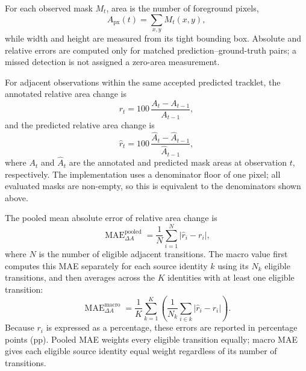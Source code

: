 \documentclass[11pt,a4paper]{article}
\begin{document}
For each observed mask $M_t$, area is the number of foreground pixels,
\begin{equation}
A_{\mathrm{px}}(t)=\sum_{x,y}M_t(x,y),
\end{equation}
while width and height are measured from its tight bounding box. Absolute and relative errors are computed only for matched prediction--ground-truth pairs; a missed detection is not assigned a zero-area measurement.

For adjacent observations within the same accepted predicted tracklet, the annotated relative area change is
\begin{equation}
r_t = 100\,\frac{A_t-A_{t-1}}{A_{t-1}},
\label{eq:relative-area-change}
\end{equation}
and the predicted relative area change is
\begin{equation}
\hat{r}_t = 100\,\frac{\hat{A}_t-\hat{A}_{t-1}}{\hat{A}_{t-1}},
\label{eq:predicted-relative-area-change}
\end{equation}
where $A_t$ and $\hat{A}_t$ are the annotated and predicted mask areas at observation $t$, respectively. The implementation uses a denominator floor of one pixel; all evaluated masks are non-empty, so this is equivalent to the denominators shown above.

The pooled mean absolute error of relative area change is
\begin{equation}
\operatorname{MAE}_{\Delta A}^{\mathrm{pooled}}=
\frac{1}{N}\sum_{i=1}^{N}|\hat{r}_i-r_i|,
\label{eq:area-change-mae-pooled}
\end{equation}
where $N$ is the number of eligible adjacent transitions. The macro value first computes this MAE separately for each source identity $k$ using its $N_k$ eligible transitions, and then averages across the $K$ identities with at least one eligible transition:
\begin{equation}
\operatorname{MAE}_{\Delta A}^{\mathrm{macro}}=
\frac{1}{K}\sum_{k=1}^{K}
\left(\frac{1}{N_k}\sum_{i\in k}|\hat{r}_i-r_i|\right).
\label{eq:area-change-mae-macro}
\end{equation}
Because $r_i$ is expressed as a percentage, these errors are reported in percentage points (pp). Pooled MAE weights every eligible transition equally; macro MAE gives each eligible source identity equal weight regardless of its number of transitions.
\end{document}

